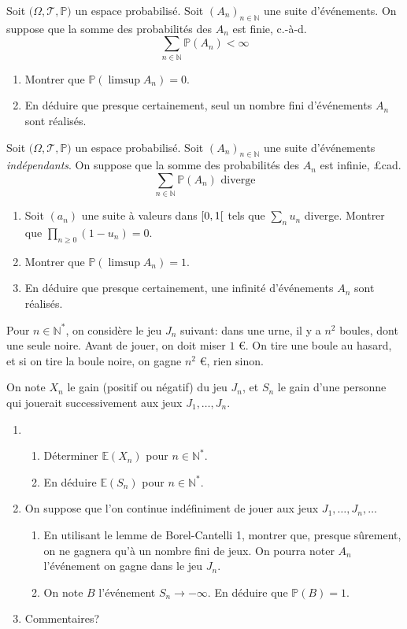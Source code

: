 \documentclass{yann}
\renewcommand{\T}{\mathscr{T}}
\newcommand{\Prob}{\bigl(Ω,\T,ℙ\bigr)}
\begin{document}

Soit $\Prob$ un espace probabilisé.
Soit $(A_n)_{n∈ℕ}$ une suite d'événements.
On suppose que la somme des probabilités des $A_n$ est finie,
c.-à-d. \[ ∑_{n∈ℕ} ℙ(A_n) < ∞ \]
\begin{enumerate}
\item
  Montrer que $ℙ(\limsup A_n) = 0$.
\item
  En déduire que presque certainement,
  seul un nombre fini d'événements $A_n$ sont réalisés.
\end{enumerate}


Soit $\Prob$ un espace probabilisé.
Soit $(A_n)_{n∈ℕ}$ une suite d'événements \emph{indépendants}.
On suppose que la somme des probabilités des $A_n$ est infinie,
£cad. \[ ∑_{n∈ℕ} ℙ(A_n) \text{ diverge} \]
\begin{enumerate}
\item
  Soit $(a_n)$ une suite à valeurs dans $\mathopen[0,1\mathclose[$ tels que $∑_n u_n$ diverge.
  Montrer que $∏_{n≥0} (1 - u_n) = 0$.
\item
  Montrer que $ℙ(\limsup A_n) = 1$.
\item
  En déduire que presque certainement,
  une infinité d'événements $A_n$ sont réalisés.
\end{enumerate}

\Exercice

Pour $n∈ℕ^*$, on considère le jeu $J_n$ suivant:
dans une urne, il y a $n^2$ boules, dont une seule noire.
Avant de jouer, on doit miser $1$ €.
On tire une boule au hasard, et si on tire la boule noire, on gagne $n^2$ €, rien sinon.

On note $X_n$ le gain (positif ou négatif) du jeu $J_n$,
et $S_n$ le gain d'une personne qui jouerait successivement aux jeux $J_1, \dots, J_n$.
\begin{enumerate}
\item
  \begin{enumerate}
  \item
    Déterminer $𝔼(X_n)$ pour $n∈ℕ^*$.
  \item
    En déduire $𝔼(S_n)$ pour $n∈ℕ^*$.
  \end{enumerate}
\item
  On suppose que l'on continue indéfiniment de jouer aux jeux $J_1, \dots, J_n, \dots$

  \begin{enumerate}
  \item
    En utilisant le lemme de Borel-Cantelli 1, montrer que,
    presque sûrement, on ne gagnera qu'à un nombre fini de jeux.
    On pourra noter $A_n$ l'événement \og{}on gagne dans le jeu $J_n$\fg{}.
  \item
    On note $B$ l'événement \og{}$S_n \to -∞$\fg{}.
    En déduire que $ℙ(B) = 1$.
  \end{enumerate}
\item
  Commentaires?
\end{enumerate}
\end{document}
